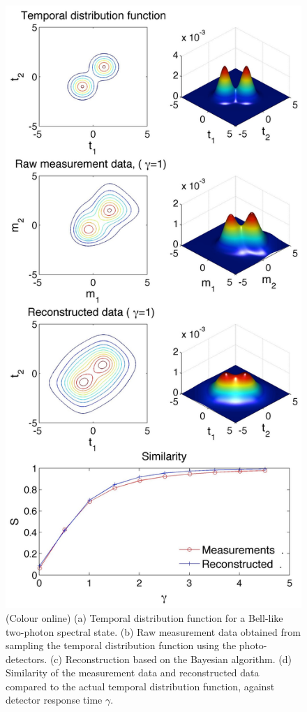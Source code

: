 \documentclass[aps,pra,twocolumn,amsmath,amssymb,color,superscriptaddress]{revtex4}
\begin{document}
\begin{figure}[!htb]
\includegraphics[width=\columnwidth]{figures/composite_bell}
\caption{(Colour online) (a) Temporal distribution function for a Bell-like two-photon spectral state. (b) Raw measurement data obtained from sampling the temporal distribution function using the photo-detectors. (c) Reconstruction based on the Bayesian algorithm. (d) Similarity of the measurement data and reconstructed data compared to the actual temporal distribution function, against detector response time $\gamma$.} \label{fig:composite_bell}
\end{figure}
\end{document}
